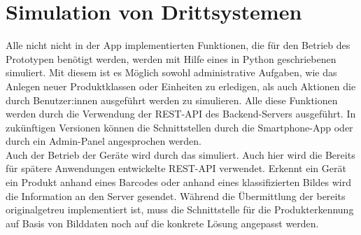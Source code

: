\section{Simulation von Drittsystemen}\label{sec:Simulation von Drittsystemen}

Alle nicht nicht in der App implementierten Funktionen, die für den Betrieb des Prototypen benötigt werden, werden mit Hilfe eines in Python geschriebenen  simuliert. Mit diesem ist es Möglich sowohl administrative Aufgaben, wie das Anlegen neuer Produktklassen oder Einheiten zu erledigen, als auch Aktionen die durch Benutzer:innen ausgeführt werden zu simulieren. Alle diese Funktionen werden durch die Verwendung der \gls{REST-API} des Backend-Servers ausgeführt. In zukünftigen Versionen können die Schnittstellen durch die Smartphone-App oder durch ein Admin-Panel angesprochen werden.\\ Auch der Betrieb der Geräte wird durch das  simuliert. Auch hier wird die Bereits für spätere Anwendungen entwickelte \gls{REST-API} verwendet. Erkennt ein Gerät ein Produkt anhand eines Barcodes oder anhand eines klassifizierten Bildes wird die Information an den Server gesendet. Während die Übermittlung der  bereits originalgetreu implementiert ist, muss die Schnittstelle für die Produkterkennung auf Basis von Bilddaten noch auf die konkrete Lösung angepasst werden.